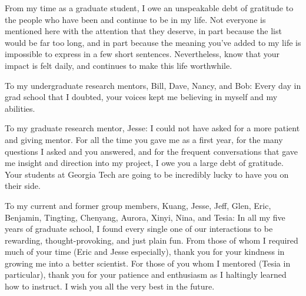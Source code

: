 

From my time as a graduate student, I owe an unspeakable debt of gratitude to
the people who have been and continue to be in my life. Not everyone is
mentioned here with the attention that they deserve, in part because the list
would be far too long, and in part because the meaning you've added to my life
is impossible to express in a few short sentences. Nevertheless, know that
your impact is felt daily, and continues to make this life worthwhile.

To my undergraduate research mentors, Bill, Dave, Nancy, and Bob: Every day in grad
school that I doubted, your voices kept me believing in myself and my
abilities. 

To my graduate research mentor, Jesse: I could not have asked for a more
patient and giving mentor. For all the time you gave me as a first year, for
the many questions I asked and you answered, and for the frequent conversations
that gave me insight and direction into my project, I owe you a large debt of
gratitude. Your students at Georgia Tech are going to be incredibly lucky to
have you on their side.

To my current and former group members, Kuang, Jesse, Jeff, Glen, Eric,
Benjamin, Tingting, Chenyang, Aurora, Xinyi, Nina, and Tesia: In all my five
years of graduate school, I found every single one of our interactions to be
rewarding, thought-provoking, and just plain fun. From those of whom I required much
of your time (Eric and Jesse especially), thank you for your kindness in
growing me into a better scientist. For those of you whom I mentored (Tesia in
particular), thank you for your patience and enthusiasm as I haltingly learned
how to instruct.  I wish you all the very best in the future.

